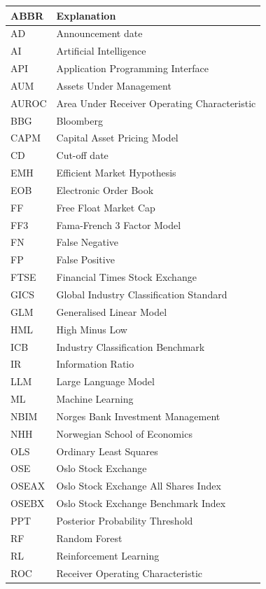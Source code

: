 \begin{appendices}
\vspace{-1em}
\begin{table}[H]
\centering
\footnotesize
\begin{tabularx}{\textwidth}{ll}
\hline
ABBR & Explanation \\ 
\hline
AD & Announcement date\\ 
AI & Artificial Intelligence \\
API & Application Programming Interface \\
AUM & Assets Under Management \\
AUROC & Area Under Receiver Operating Characteristic \\
BBG & Bloomberg \\
CAPM & Capital Asset Pricing Model \\
CD & Cut-off date \\
EMH & Efficient Market Hypothesis \\
EOB & Electronic Order Book \\
FF & Free Float Market Cap \\
FF3 & Fama-French 3 Factor Model \\
FN & False Negative \\
FP & False Positive \\
FTSE & Financial Times Stock Exchange \\
GICS & Global Industry Classification Standard \\
GLM & Generalised Linear Model \\
HML & High Minus Low \\
ICB & Industry Classification Benchmark \\
IR & Information Ratio \\
LLM & Large Language Model \\
ML & Machine Learning \\
NBIM & Norges Bank Investment Management\\ 
NHH & Norwegian School of Economics\\
OLS & Ordinary Least Squares \\
OSE & Oslo Stock Exchange \\
OSEAX & Oslo Stock Exchange All Shares Index\\
OSEBX & Oslo Stock Exchange Benchmark Index\\
PPT & Posterior Probability Threshold \\
RF & Random Forest \\
RL & Reinforcement Learning \\
ROC & Receiver Operating Characteristic \\

\end{tabularx}
\end{table}
\end{appendices}
